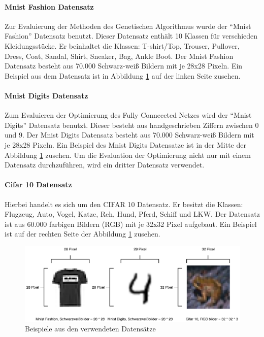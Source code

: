 \paragraph{Mnist Fashion Datensatz}
Zur Evaluierung der Methoden des Genetischen Algorithmus wurde der "`Mnist Fashion"' Datensatz benutzt. Dieser Datensatz enthält 10 Klassen für verschieden Kleidungsstücke. Er beinhaltet die Klassen: T-shirt/Top, Trouser, Pullover, Dress, Coat, Sandal, Shirt, Sneaker, Bag, Ankle Boot. Der Mnist Fashion Datensatz besteht aus 70.000 Schwarz-weiß Bildern mit je 28x28 Pixeln. Ein Beispiel aus dem Datensatz ist in Abbildung \ref{fig:dataset_example} auf der linken Seite zusehen. 

\paragraph{Mnist Digits Datensatz}
Zum Evaluieren der Optimierung des Fully Conneceted Netzes wird der "`Mnist Digits"' Datensatz benutzt. Dieser besteht aus handgeschrieben Ziffern zwischen 0 und 9. Der Mnist Digits Datensatz besteht aus 70.000 Schwarz-weiß Bildern mit je 28x28  Pixeln. Ein Beispiel des Mnist Digits Datensatze ist in der Mitte der Abbildung \ref{fig:dataset_example} zusehen. Um die Evaluation der Optimierung nicht nur mit einem Datensatz durchzuführen, wird ein dritter Datensatz verwendet.

\paragraph{Cifar 10 Datensatz}
Hierbei handelt es sich um den CIFAR 10 Datensatz. Er besitzt die Klassen: Flugzeug, Auto, Vogel, Katze, Reh, Hund, Pferd, Schiff und LKW. Der Datensatz ist aus 60.000 farbigen Bildern (RGB) mit je 32x32 Pixel aufgebaut. Ein Beispiel ist auf der rechten Seite der Abbildung \ref{fig:dataset_example} zusehen. 

\begin{figure}[H]
  \centering  
  \includegraphics[scale=0.7]{img/dataset_example.pdf}
  \caption{Beispiele aus den verwendeten Datensätze}
  \label{fig:dataset_example}
\end{figure}

